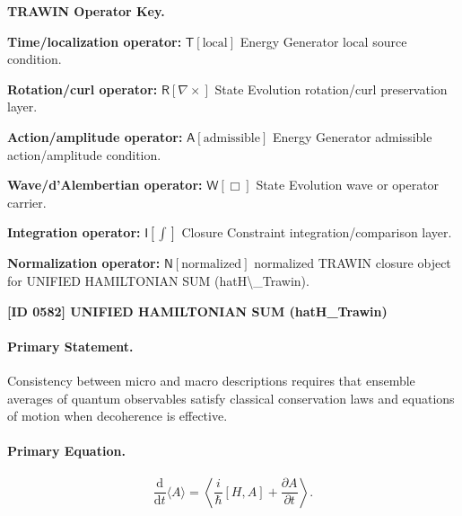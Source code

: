 \par\vspace{0.45\baselineskip}
\noindent\begin{minipage}[t]{\linewidth}
\begingroup
\small
\raggedright
\textbf{TRAWIN Operator Key.}\par
\noindent\textbf{Time/localization operator:} $\mathsf{T}\!\left[\mathrm{local}\right]$ Energy Generator local source condition.\par
\noindent\textbf{Rotation/curl operator:} $\mathsf{R}\!\left[\nabla\times\right]$ State Evolution rotation/curl preservation layer.\par
\noindent\textbf{Action/amplitude operator:} $\mathsf{A}\!\left[\mathrm{admissible}\right]$ Energy Generator admissible action/amplitude condition.\par
\noindent\textbf{Wave/d'Alembertian operator:} $\mathsf{W}\!\left[\Box\right]$ State Evolution wave or operator carrier.\par
\noindent\textbf{Integration operator:} $\mathsf{I}\!\left[\int\right]$ Closure Constraint integration/comparison layer.\par
\noindent\textbf{Normalization operator:} $\mathsf{N}\!\left[\mathrm{normalized}\right]$ normalized TRAWIN closure object for UNIFIED HAMILTONIAN SUM (hatH\textbackslash{}\_Trawin).\par
\endgroup
\end{minipage}

\clearpage
\noindent\textbf{[ID 0582] UNIFIED HAMILTONIAN SUM (hatH\_Trawin)}\par
\vspace{0.35em}
\paragraph{Primary Statement.}
Consistency between micro and macro descriptions requires that ensemble averages of quantum observables satisfy classical conservation laws and equations of motion when decoherence is effective.

\paragraph{Primary Equation.}
\begin{equation}
\frac{\mathrm{d}}{\mathrm{d}t}\langle A\rangle
=
\left\langle
\frac{i}{\hbar}[H,A]
+
\frac{\partial A}{\partial t}
\right\rangle .
\end{equation}


